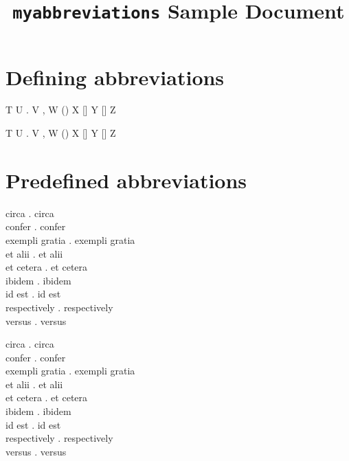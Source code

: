 \documentclass{article}
\begin{document}
\title{\texttt{myabbreviations} Sample Document}
\author{}
\date{}

\maketitle

\begin{verbatim*}
\usepackage[italics]{myabbreviations}
\end{verbatim*}

\section{Defining abbreviations}

\begin{verbatim*}
\DeclareAbbreviation{}
T \abc U \abc. V \abc, W (\abc) X [\abc] Y [\abc{}] Z
\end{verbatim*}
%
\DeclareAbbreviation{}
T \abc U \abc. V \abc, W (\abc) X [\abc] Y [\abc{}] Z

\section{Predefined abbreviations}

\begin{verbatim*}
\ca circa \ca. circa\\
\cf confer \cf. confer\\
\eg exempli gratia \eg. exempli gratia\\
\etal et alii \etal. et alii\\
\etc et cetera \etc. et cetera\\
\ibid ibidem \ibid. ibidem\\
\ie id est \ie. id est\\
\resp respectively \resp. respectively\\
\vs versus \vs. versus
\end{verbatim*}
%
\ca circa \ca. circa \\
\cf confer \cf. confer \\
\eg exempli gratia \eg. exempli gratia \\
\etal et alii \etal. et alii \\
\etc et cetera \etc. et cetera \\
\ibid ibidem \ibid. ibidem \\
\ie id est \ie. id est \\
\resp respectively \resp. respectively \\
\vs versus \vs. versus
\end{document}
